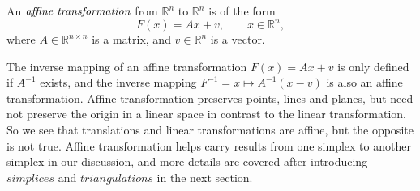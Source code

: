      \begin{definition*}
      An $\emph{affine transformation}$ from $\mathbb{R}^n$ to $\mathbb{R}^n$ is of the form
      \begin{equation*}
      {F}(x) = {Ax} + {v}, \qquad {x}\in\mathbb{R}^n,
      \end{equation*}
      where ${A}\in\mathbb{R}^{n\times n}$ is a matrix, and  ${v}\in\mathbb{R}^n$ is a vector.
      \end{definition*}
      The inverse mapping of an affine transformation $F(x) = Ax + v$ is only defined if $A^{-1}$ exists, and the inverse mapping $F^{-1} = {x} \mapsto {A}^{-1}({x} - {v})$ is also an affine transformation.
      Affine transformation preserves points, lines and planes, but need not preserve the origin in a linear space in contrast to the linear transformation. So we see that translations and linear transformations are affine, but the opposite is not true. Affine transformation helps carry results from one simplex to another simplex in our discussion, and more details are covered after introducing $simplices$ and $triangulations$ in the next section.


